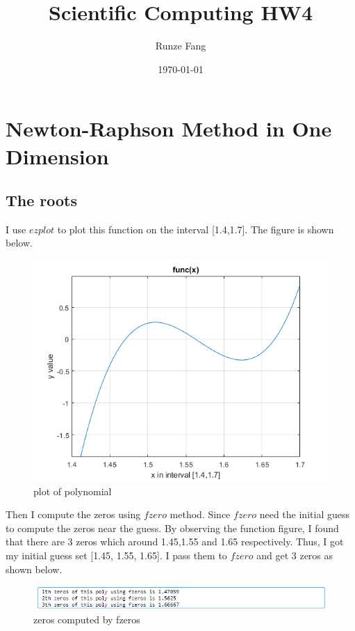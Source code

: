 \documentclass[a4paper]{article}
\title{Scientific Computing HW4}
\author{Runze Fang}
\date{\today}
\begin{document}
\maketitle
\section{Newton-Raphson Method in One Dimension}
\subsection{The roots}
I use $ezplot$ to plot this function on the interval [1.4,1.7]. The figure is shown below.

\begin{figure}[H] 
\centering 
\includegraphics[width=1.0\textwidth]{1.1-1.png}
\caption{plot of polynomial} 
\label{Fig.1.1-1} 
\end{figure}

Then I compute the zeros using $fzero$ method. Since $fzero$ need the initial guess to compute the zeros near the guess. By observing the function figure, I found that there are 3 zeros which around 1.45,1.55 and 1.65 respectively. Thus, I got my initial guess set [1.45, 1.55, 1.65]. I pass them to $fzero$ and get 3 zeros as shown below.

\begin{figure}[H] 
\centering 
\includegraphics[width=1.0\textwidth]{1.1-2.png}
\caption{zeros computed by fzeros} 
\label{Fig.1.1-2} 
\end{figure}
\end{document}
